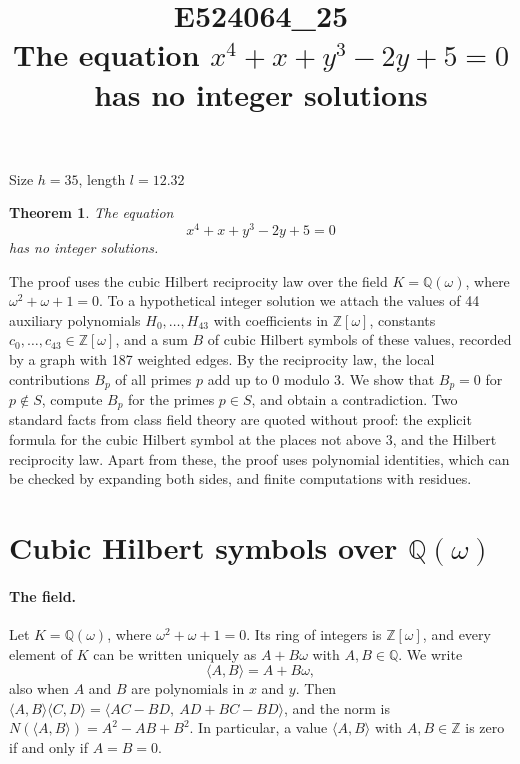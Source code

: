 \documentclass[11pt]{article}
\title{\textbf{E524064\_25}\\[4pt] {\Large The equation $x^{4}+x+y^{3}-2y+5=0$ has no integer solutions}}
\author{}
\date{}
\newtheorem{theorem}{Theorem}
\newcommand{\Z}{\mathbb{Z}}
\newcommand{\Q}{\mathbb{Q}}
\begin{document}
\maketitle
\vspace{-8ex}
\begin{center}
Size $h=35$, length $l=12.32$
\end{center}

\begin{theorem}\label{thm:main}
The equation
\begin{equation}\label{eq:main}
x^{4}+x+y^{3}-2y+5=0
\end{equation}
has no integer solutions.
\end{theorem}

The proof uses the cubic Hilbert reciprocity law over the field $K=\Q(\omega)$, where $\omega^2+\omega+1=0$. To a hypothetical integer solution we attach the values of 44 auxiliary polynomials $H_0,\dots,H_{43}$ with coefficients in $\Z[\omega]$, constants $c_0,\dots,c_{43}\in\Z[\omega]$, and a sum $B$ of cubic Hilbert symbols of these values, recorded by a graph with 187 weighted edges. By the reciprocity law, the local contributions $B_p$ of all primes $p$ add up to $0$ modulo $3$. We show that $B_p=0$ for $p\notin S$, compute $B_p$ for the primes $p\in S$, and obtain a contradiction. Two standard facts from class field theory are quoted without proof: the explicit formula for the cubic Hilbert symbol at the places not above $3$, and the Hilbert reciprocity law. Apart from these, the proof uses polynomial identities, which can be checked by expanding both sides, and finite computations with residues.


\section{\texorpdfstring{Cubic Hilbert symbols over $\Q(\omega)$}{Cubic Hilbert symbols over Q(w)}}\label{sec:symbols}

\paragraph{The field.} Let $K=\Q(\omega)$, where $\omega^2+\omega+1=0$. Its ring of integers is $\Z[\omega]$, and every element of $K$ can be written uniquely as $A+B\omega$ with $A,B\in\Q$. We write
\[
\langle A,B\rangle=A+B\omega,
\]
also when $A$ and $B$ are polynomials in $x$ and $y$. Then $\langle A,B\rangle\langle C,D\rangle=\langle AC-BD,\ AD+BC-BD\rangle$, and the norm is $N(\langle A,B\rangle)=A^2-AB+B^2$. In particular, a value $\langle A,B\rangle$ with $A,B\in\Z$ is zero if and only if $A=B=0$.
\end{document}
